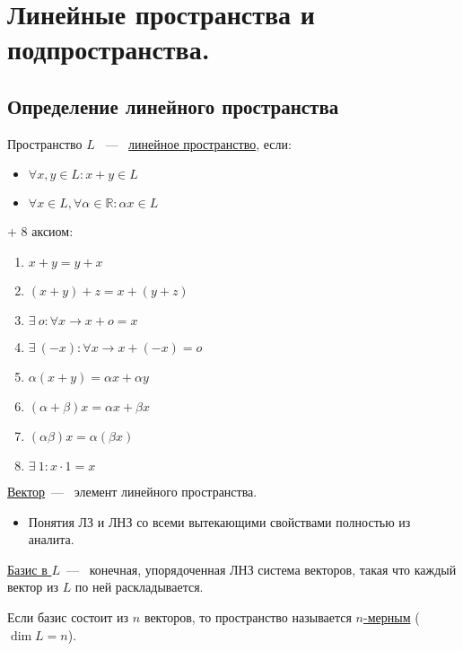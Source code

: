 \chapter{Линейные пространства и подпространства.}
\section{Определение линейного пространства}
\begin{definition} %
	Пространство $L$ ~---~ \underline{линейное пространство}, если:
	\begin{itemize}
		\item $\forall x, y \in L: x + y \in L$
		\item $\forall x \in L, \forall \alpha \in \mathbb{R} : \alpha x \in L$
	\end{itemize}
	
	+ 8 аксиом:
	\begin{enumerate}
		\item $x + y = y+x$
		\item $(x+y) +z=x +(y+z)$
		\item $\exists\ o : \forall x \rightarrow x+o=x$
		\item $\exists\ (-x):\forall x \rightarrow  x+(-x) = o$
		\item $\alpha(x+y) = \alpha x+\alpha y$
		\item $(\alpha +\beta)x = \alpha x+\beta x$
		\item $(\alpha\beta) x=\alpha(\beta x)$
		\item $\exists\ 1: x\cdot 1= x$
	\end{enumerate}
\end{definition} 
\underline{Вектор}~---~ элемент линейного пространства.

\begin{itemize}
	\item Понятия ЛЗ и ЛНЗ со всеми вытекающими свойствами полностью из аналита.
\end{itemize}

\begin{definition}
	\underline{Базис в $L$}~---~ конечная, упорядоченная ЛНЗ система векторов, такая что каждый вектор из $L$ по ней раскладывается.
\end{definition}
Если базис состоит из $n$ векторов, то пространство называется \underline{$n$-мерным} ($\dim L = n$). %
\vspace{3mm}


